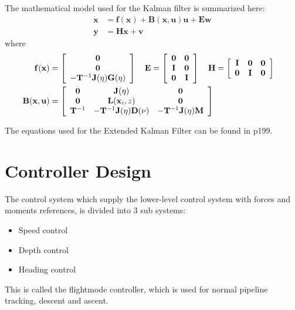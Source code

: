 	The mathematical model used for the Kalman filter is summarized here:
		\begin{align}
			\mathbf{\dot{x}} &= \mathbf{f(x)} + \mathbf{B(x, u) u} + \mathbf{E w} \\
			\mathbf{y} &= \mathbf{H x} + \mathbf{v}
		\end{align}
	where
		\begin{align}
			\mathbf{f(x)} &= \left[ \begin{array}{c}
						\mathbf{0}\\
						\mathbf{0}\\
						-\mathbf{T}^{-1} \mathbf{J}(\mathbf{\eta}) \mathbf{G}(\mathbf{\eta})
						\end{array} \right] \quad 
			\mathbf{E} = \left[ \begin{array}{cc}
			                      	\mathbf{0} & \mathbf{0} \\
			                      	\mathbf{I} & \mathbf{0}\\
			                      	\mathbf{0} & \mathbf{I}
			                     \end{array} \right] \quad
			\mathbf{H} = \left[ \begin{array}{ccc}
			                      	\mathbf{I} & \mathbf{0} & \mathbf{0}\\
			                      	\mathbf{0} & \mathbf{I} & \mathbf{0}
			                     \end{array} \right] \\
			\mathbf{B(x, u)} &= \left[ \begin{array}{ccc}
			                      	\mathbf{0} & \mathbf{J}(\mathbf{\eta}) & \mathbf{0}\\
			                      	\mathbf{0} & \mathbf{L}(\mathbf{x}_i, z) & \mathbf{0}\\
			                      	\mathbf{T}^{-1} & -\mathbf{T}^{-1}\mathbf{J}(\mathbf{\eta}) \mathbf{D(\nu)} 
						& -\mathbf{T}^{-1} \mathbf{J}(\mathbf{\eta}) \mathbf{M}
			                     \end{array} \right] &
		\end{align}

	The equations used for the Extended Kalman Filter can be found in \cite{fossen} p199.
	
\section{Controller Design}
	The control system which supply the lower-level control system with forces and moments references, is 
	divided into 3 sub systems:
		\begin{itemize}
		 \item Speed control
		 \item Depth control
		 \item Heading control
		\end{itemize}
	This is called the flightmode controller, which is used for normal pipeline tracking, descent and ascent. 
	
